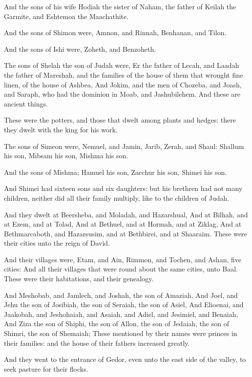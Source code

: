 \verse And the sons of his wife Hodiah the sister of Naham, the father of Keilah the Garmite, and Eshtemoa the Maachathite.

\verse And the sons of Shimon were, Amnon, and Rinnah, Benhanan, and Tilon.

And the sons of Ishi were, Zoheth, and Benzoheth.

\verse The sons of Shelah the son of Judah were, Er the father of Lecah, and Laadah the father of Mareshah, and the families of the house of them that wrought fine linen, of the house of Ashbea, \verse And Jokim, and the men of Chozeba, and Joash, and Saraph, who had the dominion in Moab, and Jashubilehem. And these are ancient things.

\verse These were the potters, and those that dwelt among plants and hedges: there they dwelt with the king for his work.

\verse The sons of Simeon were, Nemuel, and Jamin, Jarib, Zerah, and Shaul: \verse Shallum his son, Mibsam his son, Mishma his son.

\verse And the sons of Mishma; Hamuel his son, Zacchur his son, Shimei his son.

\verse And Shimei had sixteen sons and six daughters: but his brethren had not many children, neither did all their family multiply, like to the children of Judah.

\verse And they dwelt at Beersheba, and Moladah, and Hazarshual, \verse And at Bilhah, and at Ezem, and at Tolad, \verse And at Bethuel, and at Hormah, and at Ziklag, \verse And at Bethmarcaboth, and Hazarsusim, and at Bethbirei, and at Shaaraim. These were their cities unto the reign of David.

\verse And their villages were, Etam, and Ain, Rimmon, and Tochen, and Ashan, five cities: \verse And all their villages that were round about the same cities, unto Baal. These were their habitations, and their genealogy.

\verse And Meshobab, and Jamlech, and Joshah, the son of Amaziah, \verse And Joel, and Jehu the son of Josibiah, the son of Seraiah, the son of Asiel, \verse And Elioenai, and Jaakobah, and Jeshohaiah, and Asaiah, and Adiel, and Jesimiel, and Benaiah, \verse And Ziza the son of Shiphi, the son of Allon, the son of Jedaiah, the son of Shimri, the son of Shemaiah; \verse These mentioned by their names were princes in their families: and the house of their fathers increased greatly.

\verse And they went to the entrance of Gedor, even unto the east side of the valley, to seek pasture for their flocks.

